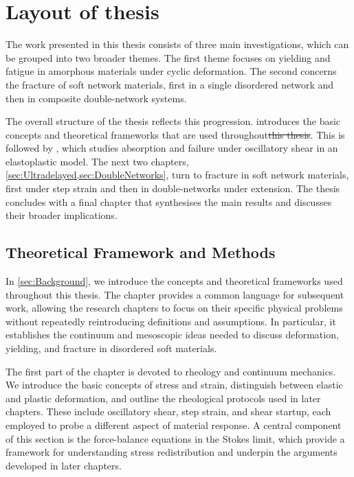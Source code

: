 \documentclass[asymmetricmargins]{library/duthesis}%
\providecommand{\DIFdel}[1]{{\protect\color{red}\sout{#1}}}                      %
\providecommand{\DIFdelbegin}{} %
\providecommand{\DIFdelend}{} %
\begin{document}
\newpage
\section{Layout of thesis}

The work presented in this thesis consists of three main investigations, which can be grouped into two broader themes. The first theme focuses on yielding and fatigue in amorphous materials under cyclic deformation. The second concerns the fracture of soft network materials, first in a single disordered network and then in composite double-network systems. 

The overall structure of the thesis reflects this progression.  introduces the basic concepts and theoretical frameworks that are used throughout\DIFdelbegin \DIFdel{this thesis}\DIFdelend . This is followed by , which studies absorption and failure under oscillatory shear in an elastoplastic model. The next two chapters, \cref{sec:Ultradelayed,sec:DoubleNetworks}, turn to fracture in soft network materials, first under step strain and then in double-networks under extension. The thesis concludes with a final chapter that synthesises the main results and discusses their broader implications.

\subsection*{Theoretical Framework and Methods}
In \cref{sec:Background}, we introduce the concepts and theoretical frameworks used throughout this thesis. The chapter provides a common language for subsequent work, allowing the research chapters to focus on their specific physical problems without repeatedly reintroducing definitions and assumptions. In particular, it establishes the continuum and mesoscopic ideas needed to discuss deformation, yielding, and fracture in disordered soft materials.

The first part of the chapter is devoted to rheology and continuum mechanics. We introduce the basic concepts of stress and strain, distinguish between elastic and plastic deformation, and outline the rheological protocols used in later chapters. These include oscillatory shear, step strain, and shear startup, each employed to probe a different aspect of material response. A central component of this section is the force-balance equations in the Stokes limit, which provide a framework for understanding stress redistribution and underpin the arguments developed in later chapters.
\end{document}
